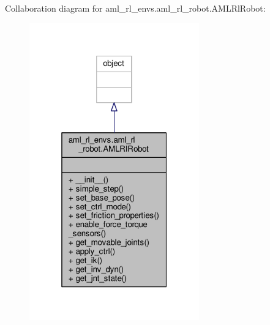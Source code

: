 Collaboration diagram for aml\-\_\-rl\-\_\-envs.\-aml\-\_\-rl\-\_\-robot.\-A\-M\-L\-Rl\-Robot\-:
\nopagebreak
\begin{figure}[H]
\begin{center}
\leavevmode
\includegraphics[width=208pt]{classaml__rl__envs_1_1aml__rl__robot_1_1_a_m_l_rl_robot__coll__graph}
\end{center}
\end{figure}
